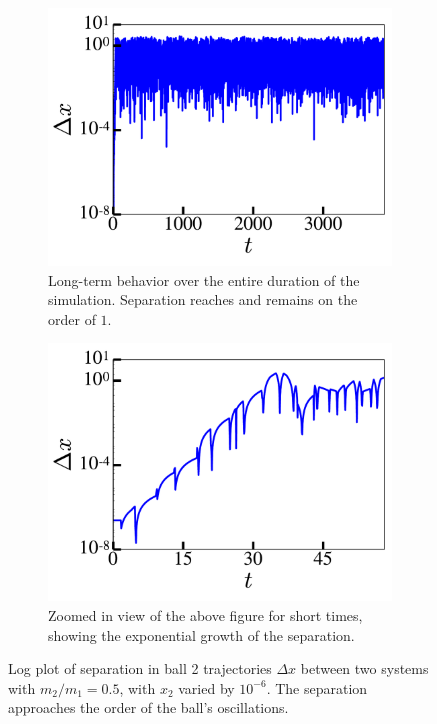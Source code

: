 \documentclass[pra,twocolumn,showpacs,amsmath,amssymb, aps, 10pt]{revtex4-1}
\begin{document}
\begin{figure}
  \begin{subfigure}{\linewidth}
    \includegraphics[width=0.8\linewidth]{r2_0_lyapunov}
    \caption{Long-term behavior over the entire duration of the simulation.
    Separation reaches and remains on the order of $1$.}
    \label{fig:2-lyapunov}
  \end{subfigure}

  \begin{subfigure}{0.8\linewidth}
    \includegraphics[width=\linewidth]{zoomed_r2_0_lyapunov}
    \caption{Zoomed in view of the above figure for short times, showing the
    exponential growth of the separation.}
    \label{fig:2-lyapunov-zoomed}
  \end{subfigure}
  \caption{Log plot of separation in ball 2 trajectories $\Delta x$
   between two systems with $m_2/m_1 = 0.5$, with $x_2$ varied by $10^{-6}$.
   The separation approaches the order of the ball's oscillations.}
\end{figure}
\end{document}
